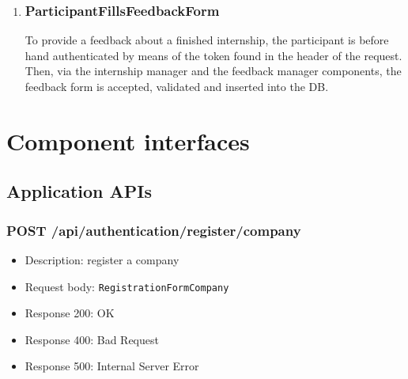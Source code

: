 \begin{enumerate}[label=\textbf{RV\arabic* -}]
\item \subsubsection{ParticipantFillsFeedbackForm}

To provide a feedback about a finished internship, the participant is before hand authenticated by means of the token found in the header of the request.
Then, via the internship manager and the feedback manager components, the feedback form is accepted, validated and inserted into the DB.

\begin{figure}[H]
    \centering
\end{figure}

\end{enumerate}

\section{Component interfaces}

\subsection{Application APIs}

\subsubsection{POST /api/authentication/register/company}
\begin{itemize}
    \item Description: register a company
    \item Request body: \verb|RegistrationFormCompany|
    \item Response 200: OK
    \item Response 400: Bad Request
    \item Response 500: Internal Server Error
\end{itemize}

